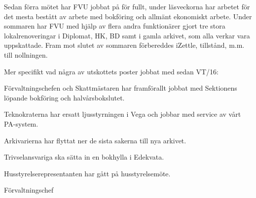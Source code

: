\documentclass[../_main/handlingar.tex]{subfiles}
\begin{document}

Sedan förra mötet har FVU jobbat på för fullt, under läsveckorna har arbetet för det mesta bestått av arbete med bokföring och allmänt ekonomiskt arbete. Under sommaren har FVU med hjälp av flera andra funktionärer gjort tre stora lokalrenoveringar i Diplomat, HK, BD samt i gamla arkivet, som alla verkar vara uppskattade. Fram mot slutet av sommaren förbereddes iZettle, tillstånd, m.m. till nollningen.

Mer specifikt vad några av utskottets poster jobbat med sedan VT/16:
\begin{dashlist}
    \item Förvaltningschefen och Skattmästaren har framförallt jobbat med Sektionens löpande bokföring och halvårsbokslutet.
    \item Teknokraterna har ersatt ljusstyrningen i Vega och jobbar med service av vårt PA-system.
    \item Arkivarierna har flyttat ner de sista sakerna till nya arkivet.
    \item Trivselansvariga ska sätta in en bokhylla i Edekvata.
    \item Husstyrelserepresentanten har gått på husstyrelsemöte.
\end{dashlist}

\begin{signatures}{1}
    \mvh
    \signature{Anders Nilsson}{Förvaltningschef}
\end{signatures}
\end{document}
